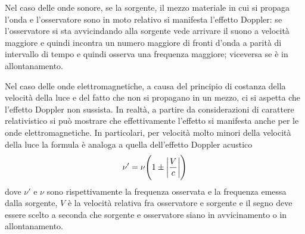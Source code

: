 Nel caso delle onde sonore, se la sorgente, il mezzo materiale in cui si propaga l'onda
e l'osservatore sono in moto relativo si manifesta l'effetto Doppler: se l'osservatore si sta avvicindando alla sorgente
vede arrivare il suono a velocità maggiore e quindi incontra un numero maggiore di fronti d'onda a parità
di intervallo di tempo e quindi osserva una frequenza maggiore; viceversa se è in allontanamento.

Nel caso delle onde elettromagnetiche, a causa del principio di costanza della velocità della luce e del
fatto che non si propagano in un mezzo, ci si aspetta che l'effetto Doppler non sussista. In realtà,
a partire da considerazioni di carattere relativistico si può mostrare che effettivamente l'effetto
si manifesta anche per le onde elettromagnetiche. In particolari, per velocità molto minori della
velocità della luce la formula è analoga a quella dell'effetto Doppler acustico
\[
\nu'=\nu \Biggl(1\pm\abs{\frac{V}{c}}\Biggr)
\]
dove $\nu'$ e $\nu$ sono rispettivamente la frequenza osservata e la frequenza emessa dalla sorgente, $V$ è
la velocità relativa fra osservatore e sorgente e il segno deve essere scelto a seconda che
sorgente e osservatore siano in avvicinamento o in allontanamento.
